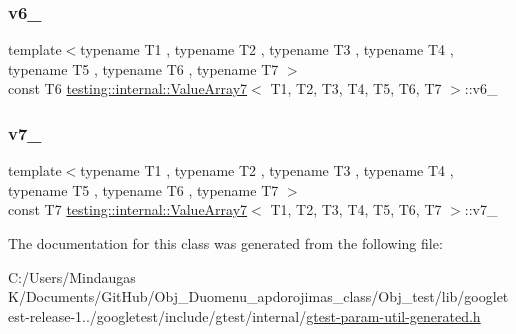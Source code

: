 \mbox{\label{classtesting_1_1internal_1_1_value_array7_a0c8d9281548832942cef2b008cdd2727}} 
\subsubsection{\texorpdfstring{v6\_}{v6\_}}
{\footnotesize\ttfamily template$<$typename T1 , typename T2 , typename T3 , typename T4 , typename T5 , typename T6 , typename T7 $>$ \\
const T6 \mbox{\hyperlink{classtesting_1_1internal_1_1_value_array7}{testing\+::internal\+::\+Value\+Array7}}$<$ T1, T2, T3, T4, T5, T6, T7 $>$\+::v6\+\_\+\hspace{0.3cm}{\ttfamily [private]}}

\mbox{\label{classtesting_1_1internal_1_1_value_array7_a3ffae36b5a10fee9f049b4465f7bb58a}} 
\subsubsection{\texorpdfstring{v7\_}{v7\_}}
{\footnotesize\ttfamily template$<$typename T1 , typename T2 , typename T3 , typename T4 , typename T5 , typename T6 , typename T7 $>$ \\
const T7 \mbox{\hyperlink{classtesting_1_1internal_1_1_value_array7}{testing\+::internal\+::\+Value\+Array7}}$<$ T1, T2, T3, T4, T5, T6, T7 $>$\+::v7\+\_\+\hspace{0.3cm}{\ttfamily [private]}}



The documentation for this class was generated from the following file\+:\begin{DoxyCompactItemize}
\item 
C\+:/\+Users/\+Mindaugas K/\+Documents/\+Git\+Hub/\+Obj\+\_\+\+Duomenu\+\_\+apdorojimas\+\_\+class/\+Obj\+\_\+test/lib/googletest-\/release-\/1../googletest/include/gtest/internal/\mbox{\hyperlink{gtest-param-util-generated_8h}{gtest-\/param-\/util-\/generated.\+h}}\end{DoxyCompactItemize}
